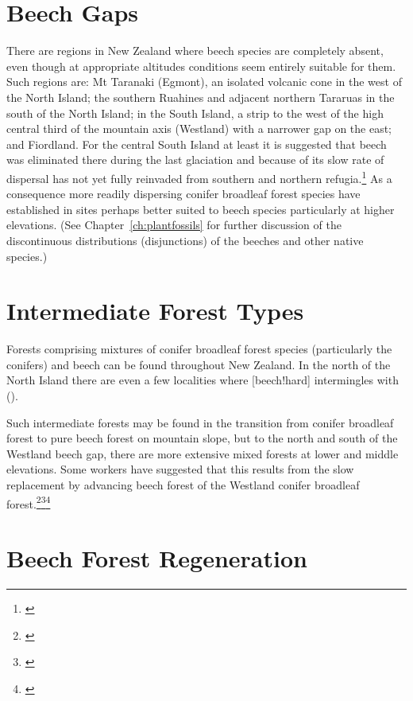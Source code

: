 \section{Beech Gaps}

There are regions in New Zealand where beech species are completely absent, even though at appropriate altitudes conditions seem entirely suitable for them.
Such regions are: Mt Taranaki (Egmont), an isolated volcanic cone in the west of the North Island; the southern Ruahines and adjacent northern Tararuas in the south of the North Island; in the South Island, a strip to the west of the high central third of the mountain axis (Westland) with a narrower gap on the east; and Fiordland.
For the central South Island at least it is suggested that beech was eliminated there during the last glaciation and because of its slow rate of dispersal has not yet fully reinvaded from southern and northern refugia.\footnote{\cite{wardle1965comparison}}
As a consequence more readily dispersing conifer broadleaf forest species have established in sites perhaps better suited to beech species particularly at higher elevations. (See Chapter~\ref{ch:plantfossils}  for further discussion of the discontinuous distributions (disjunctions) of the beeches and other native species.)

\section{Intermediate Forest Types}

Forests comprising mixtures of conifer broadleaf forest species (particularly the conifers) and beech can be found throughout New Zealand.
In the north of the North Island there are even a few localities where [beech!hard] intermingles with  ().

Such intermediate forests may be found in the transition from conifer broadleaf forest to pure beech forest on mountain slope, but to the north and south of the Westland beech gap, there are more extensive mixed forests at lower and middle elevations.
Some workers have suggested that this results from the slow replacement by advancing beech forest of the Westland conifer broadleaf forest.\footnote{\cite{holloway1954forests}}\footnote{\cite{wardle1964facets}}\footnote{\cite{wardle1980ecology}}

\section{Beech Forest Regeneration}

